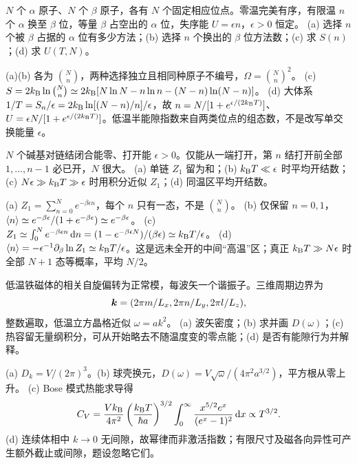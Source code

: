 \begin{exercise}
$N$ 个 $\alpha$ 原子、$N$ 个 $\beta$ 原子，各有 $N$ 个固定相应位点。零温完美有序，有限温 $n$ 个 $\alpha$ 换至 $\beta$ 位，等量 $\beta$ 占空出的 $\alpha$ 位，失序能 $U=\epsilon n$，$\epsilon>0$ 恒定。
(a) 选择 $n$ 个被 $\beta$ 占据的 $\alpha$ 位有多少方法；(b) 选择 $n$ 个换出的 $\beta$ 位方法数；(c) 求 $S(n)$；(d) 求 $U(T,N)$。
\end{exercise}
\begin{solution}
(a)(b) 各为 $\binom Nn$，两种选择独立且相同种原子不编号，$\Omega=\binom Nn^2$。
(c) $S=2k_{\mathrm B}\ln\binom Nn\simeq2k_{\mathrm B}[N\ln N-n\ln n-(N-n)\ln(N-n)]$。
(d) 大体系 $1/T=S_n/\epsilon=2k_{\mathrm B}\ln[(N-n)/n]/\epsilon$，故 $n=N/[1+e^{\epsilon/(2k_{\mathrm B} T)}]$、$U=\epsilon N/[1+e^{\epsilon/(2k_{\mathrm B} T)}]$。低温半能隙指数来自两类位点的组态数，不是改写单交换能量 $\epsilon$。
\end{solution}
\begin{exercise}
$N$ 个碱基对链结闭合能零、打开能 $\epsilon>0$。仅能从一端打开，第 $n$ 结打开前全部 $1,\ldots,n-1$ 必已开，$N$ 很大。
(a) 单链 $Z_1$ 留为和；(b) $k_{\mathrm B} T\ll\epsilon$ 时平均开结数；(c) $N\epsilon\gg k_{\mathrm B} T\gg\epsilon$ 时用积分近似 $Z_1$；(d) 同温区平均开结数。
\end{exercise}
\begin{solution}
(a) $Z_1=\sum_{n=0}^Ne^{-\beta\epsilon n}$，每个 $n$ 只有一态，不是 $\binom Nn$。
(b) 仅保留 $n=0,1$，$\langle n\rangle\simeq e^{-\beta\epsilon}/(1+e^{-\beta\epsilon})\simeq e^{-\beta\epsilon}$。
(c) $Z_1\simeq\int_0^Ne^{-\beta\epsilon n}\,\mathrm d n=(1-e^{-\beta\epsilon N})/(\beta\epsilon)\simeq k_{\mathrm B} T/\epsilon$。
(d) $\langle n\rangle=-\epsilon^{-1}\partial_\beta\ln Z_1\simeq k_{\mathrm B} T/\epsilon$。这是远未全开的中间“高温”区；真正 $k_{\mathrm B} T\gg N\epsilon$ 时全部 $N+1$ 态等概率，平均 $N/2$。
\end{solution}
\begin{exercise}
低温铁磁体的相关自旋偏转为正常模，每波矢一个谐振子。三维周期边界为\[\boldsymbol{k}=(2\pi m/L_x,2\pi n/L_y,2\pi l/L_z),\]整数遍取，低温立方晶格近似 $\omega=ak^2$。
(a) 波矢密度；(b) 求并画 $D(\omega)$；(c) 热容留无量纲积分，可从开始略去不随温度变的零点能；(d) 是否有能隙行为并解释。
\end{exercise}
\begin{solution}
(a) $D_k=V/(2\pi)^3$。(b) 球壳换元，$D(\omega)=V\sqrt\omega/(4\pi^2a^{3/2})$，平方根从零上升。
(c) Bose 模式热能求导得
\[C_V=\frac{Vk_{\mathrm B}}{4\pi^2}\left(\frac{k_{\mathrm B} T}{\hbar a}\right)^{3/2}\int_0^\infty\frac{x^{5/2}e^x}{(e^x-1)^2}\,\mathrm d x\propto T^{3/2}.\]
(d) 连续体相中 $k\to0$ 无间隙，故幂律而非激活指数；有限尺寸及磁各向异性可产生额外截止或间隙，题设忽略它们。
\end{solution}
